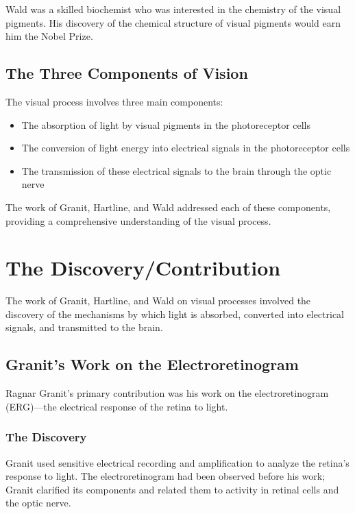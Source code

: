 Wald was a skilled biochemist who was interested in the chemistry of the visual pigments. His discovery of the chemical structure of visual pigments would earn him the Nobel Prize.

\subsection{The Three Components of Vision}

The visual process involves three main components:

\begin{itemize}
\item The absorption of light by visual pigments in the photoreceptor cells
\item The conversion of light energy into electrical signals in the photoreceptor cells
\item The transmission of these electrical signals to the brain through the optic nerve
\end{itemize}

The work of Granit, Hartline, and Wald addressed each of these components, providing a comprehensive understanding of the visual process.

\section{The Discovery/Contribution}

The work of Granit, Hartline, and Wald on visual processes involved the discovery of the mechanisms by which light is absorbed, converted into electrical signals, and transmitted to the brain.

\subsection{Granit's Work on the Electroretinogram}

Ragnar Granit's primary contribution was his work on the electroretinogram (ERG)---the electrical response of the retina to light.

\subsubsection{The Discovery}

Granit used sensitive electrical recording and amplification to analyze the retina's response to light. The electroretinogram had been observed before his work; Granit clarified its components and related them to activity in retinal cells and the optic nerve.

